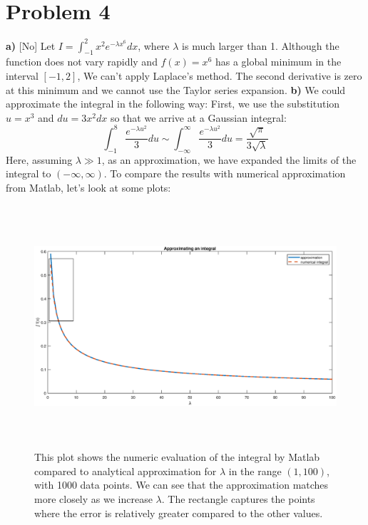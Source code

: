 \documentclass[12pt,letterpaper]{article}
\begin{document}
\section*{Problem 4}

\textbf{a)} [No] Let $I = \int_{-1}^2 x^2 e^{-\lambda x^6} dx$, where $\lambda$ is much larger than 1. Although the function does not vary rapidly and $f(x) = x^6 $ has a global minimum in the interval $[-1,2]$, We can't apply Laplace's method. The second derivative is zero at this minimum and we cannot use the Taylor series expansion. 
\newline \newline \textbf{b)} We could approximate the integral in the following way:
\newline First, we use the substitution $u = x^3$ and $du = 3x^2 dx$ so that we arrive at a Gaussian integral:
\begin{equation}
    \int^8_{-1} \frac{e^{-\lambda u^2}}{3} du \sim  \int^\infty_{-\infty} \frac{e^{-\lambda u^2}}{3} du = \frac{\sqrt{\pi}}{3 \sqrt{\lambda}}
\end{equation}
Here, assuming $\lambda \gg 1$, as an approximation, we have expanded the limits of the integral to $(-\infty,\infty )$.
To compare the results with numerical approximation from Matlab, let's look at some plots:
\begin{figure}[h]
    \centering
    \includegraphics[height=9cm]{problem4/hw3_3_b.eps}
    \caption{This plot shows the numeric evaluation of the integral by Matlab compared to analytical approximation for $\lambda$ in the range $(1,100)$, with 1000 data points. We can see that the approximation matches more closely as we increase $\lambda$. The rectangle captures the points where the error is relatively greater compared to the other values. }
    \label{fig:fapp1}
\end{figure}
\end{document}
